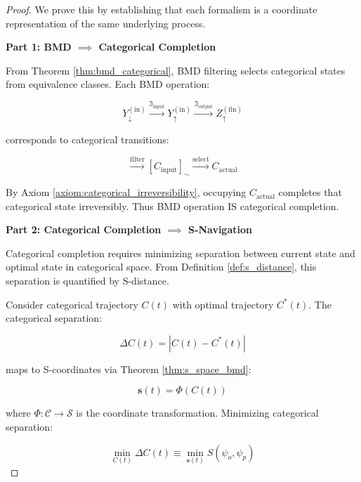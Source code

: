 \documentclass[12pt,a4paper]{article}
\begin{document}
\begin{proof}
We prove this by establishing that each formalism is a coordinate representation of the same underlying process.

\textbf{Part 1: BMD $\implies$ Categorical Completion}

From Theorem \ref{thm:bmd_categorical}, BMD filtering selects categorical states from equivalence classes. Each BMD operation:

\begin{equation}
Y_{\downarrow}^{(\text{in})} \xrightarrow{\Im_{\text{input}}} Y_{\uparrow}^{(\text{in})} \xrightarrow{\Im_{\text{output}}} Z_{\uparrow}^{(\text{fin})}
\end{equation}

corresponds to categorical transitions:

\begin{equation}
[C_{\text{potential}}] \xrightarrow{\text{filter}} [C_{\text{input}}]_{\sim} \xrightarrow{\text{select}} C_{\text{actual}}
\end{equation}

By Axiom \ref{axiom:categorical_irreversibility}, occupying $C_{\text{actual}}$ completes that categorical state irreversibly. Thus BMD operation IS categorical completion.

\textbf{Part 2: Categorical Completion $\implies$ S-Navigation}

Categorical completion requires minimizing separation between current state and optimal state in categorical space. From Definition \ref{def:s_distance}, this separation is quantified by S-distance.

Consider categorical trajectory $C(t)$ with optimal trajectory $C^*(t)$. The categorical separation:

\begin{equation}
\Delta C(t) = |C(t) - C^*(t)|
\end{equation}

maps to S-coordinates via Theorem \ref{thm:s_space_bmd}:

\begin{equation}
\mathbf{s}(t) = \Phi(C(t))
\end{equation}

where $\Phi: \mathcal{C} \to \mathcal{S}$ is the coordinate transformation. Minimizing categorical separation:

\begin{equation}
\min_{C(t)} \Delta C(t) \equiv \min_{\mathbf{s}(t)} S(\psi_o, \psi_p)
\end{equation}


\end{proof}
\end{document}
